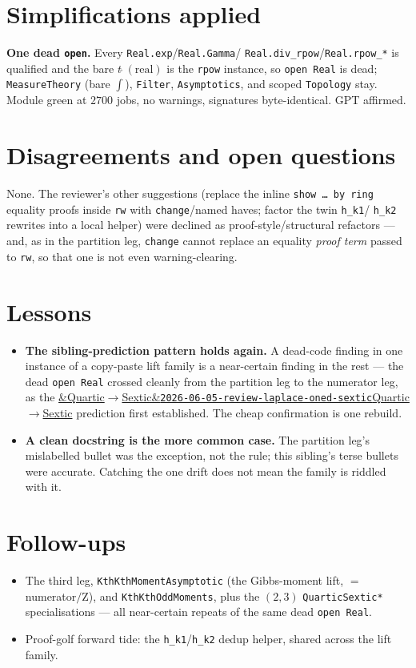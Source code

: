 \documentclass[11pt]{article}
\newcommand{\reviewref}[2][]{\href{https://therisensea.org/reviews/#2/}{\ifx&#1&\texttt{#2}\else#1\fi}}
\begin{document}
\section{Simplifications applied}
\textbf{One dead \texttt{open}.} Every \texttt{Real.exp}/\texttt{Real.Gamma}/%
\texttt{Real.div\_rpow}/\texttt{Real.rpow\_*} is qualified and the bare $t\,\hat{}\,(\text{real})$
is the \texttt{rpow} instance, so \texttt{open Real} is dead; \texttt{MeasureTheory} (bare
$\int$), \texttt{Filter}, \texttt{Asymptotics}, and scoped \texttt{Topology} stay. Module green at
$2700$ jobs, no warnings, signatures byte-identical. GPT affirmed.

\section{Disagreements and open questions}
None. The reviewer's other suggestions (replace the inline \texttt{show \dots\ by ring} equality
proofs inside \texttt{rw} with \texttt{change}/named haves; factor the twin \texttt{h\_k1}/%
\texttt{h\_k2} rewrites into a local helper) were declined as proof-style/structural refactors ---
and, as in the partition leg, \texttt{change} cannot replace an equality \emph{proof term} passed to
\texttt{rw}, so that one is not even warning-clearing.

\section{Lessons}
\begin{itemize}[noitemsep]
  \item \textbf{The sibling-prediction pattern holds again.} A dead-code finding in one instance of
    a copy-paste lift family is a near-certain finding in the rest --- the dead \texttt{open Real}
    crossed cleanly from the partition leg to the numerator leg, as the
    \reviewref[Quartic$\to$Sextic]{2026-06-05-review-laplace-oned-sextic} prediction first
    established. The cheap confirmation is one rebuild.
  \item \textbf{A clean docstring is the more common case.} The partition leg's mislabelled bullet
    was the exception, not the rule; this sibling's terse bullets were accurate. Catching the one
    drift does not mean the family is riddled with it.
\end{itemize}

\section{Follow-ups}
\begin{itemize}[noitemsep]
  \item The third leg, \texttt{KthKthMomentAsymptotic} (the Gibbs-moment lift, $=$ numerator$/$Z),
    and \texttt{KthKthOddMoments}, plus the $(2,3)$ \texttt{QuarticSextic*} specialisations --- all
    near-certain repeats of the same dead \texttt{open Real}.
  \item Proof-golf forward tide: the \texttt{h\_k1}/\texttt{h\_k2} dedup helper, shared across the
    lift family.
\end{itemize}
\end{document}
